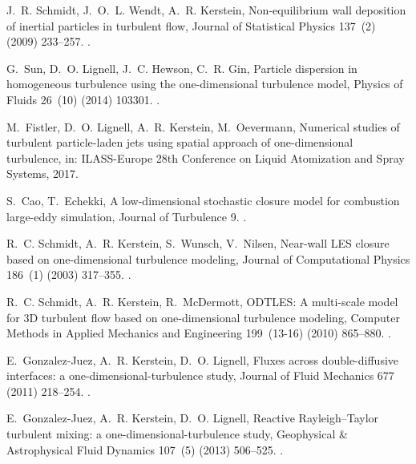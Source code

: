 \documentclass[preprint,12pt, a4paper]{elsarticle}
\begin{document}
\begin{thebibliography}{10}
J.~R. Schmidt, J.~O.~L. Wendt, A.~R. Kerstein, Non-equilibrium wall deposition
  of inertial particles in turbulent flow, Journal of Statistical Physics
  137~(2) (2009) 233--257.
\newblock \href {http://dx.doi.org/10.1007/s10955-009-9844-8}
  {}.

G.~Sun, D.~O. Lignell, J.~C. Hewson, C.~R. Gin, Particle dispersion in
  homogeneous turbulence using the one-dimensional turbulence model, Physics of
  Fluids 26~(10) (2014) 103301.
\newblock \href {http://dx.doi.org/10.1063/1.4896555}
  {}.

M.~Fistler, D.~O. Lignell, A.~R. Kerstein, M.~Oevermann, Numerical studies of
  turbulent particle-laden jets using spatial approach of one-dimensional
  turbulence, in: ILASS-Europe 28th Conference on Liquid Atomization and Spray
  Systems, 2017.

S.~Cao, T.~Echekki, A low-dimensional stochastic closure model for combustion
  large-eddy simulation, Journal of Turbulence 9.
\newblock \href {http://dx.doi.org/10.1080/14685240701790714}
  {}.

R.~C. Schmidt, A.~R. Kerstein, S.~Wunsch, V.~Nilsen, Near-wall {LES} closure
  based on one-dimensional turbulence modeling, Journal of Computational
  Physics 186~(1) (2003) 317--355.
\newblock \href {http://dx.doi.org/10.1016/S0021-9991(03)00071-8}
  {}.

R.~C. Schmidt, A.~R. Kerstein, R.~McDermott, {ODTLES}: A multi-scale model for
  3{D} turbulent flow based on one-dimensional turbulence modeling, Computer
  Methods in Applied Mechanics and Engineering 199~(13-16) (2010) 865--880.
\newblock \href {http://dx.doi.org/10.1016/j.cma.2008.05.028}
  {}.

E.~Gonzalez-Juez, A.~R. Kerstein, D.~O. Lignell, Fluxes across double-diffusive
  interfaces: a one-dimensional-turbulence study, Journal of Fluid Mechanics
  677 (2011) 218--254.
\newblock \href {http://dx.doi.org/10.1017/jfm.2011.78}
  {}.

E.~Gonzalez-Juez, A.~R. Kerstein, D.~O. Lignell, Reactive {R}ayleigh--{T}aylor
  turbulent mixing: a one-dimensional-turbulence study, Geophysical {\&}
  Astrophysical Fluid Dynamics 107~(5) (2013) 506--525.
\newblock \href {http://dx.doi.org/10.1080/03091929.2012.736504}
  {}.


\end{thebibliography}
\end{document}
